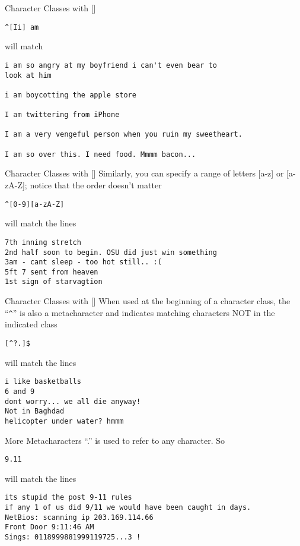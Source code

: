 \documentclass[aspectratio=169]{beamer}
\begin{document}
\begin{frame}[fragile]{Character Classes with []}
\begin{verbatim}
^[Ii] am
\end{verbatim}
will match
\begin{verbatim}
i am so angry at my boyfriend i can't even bear to 
look at him

i am boycotting the apple store

I am twittering from iPhone

I am a very vengeful person when you ruin my sweetheart.

I am so over this. I need food. Mmmm bacon...
\end{verbatim}
\end{frame}

\begin{frame}[fragile]{Character Classes with []}
Similarly, you can specify a range of letters [a-z] or 
[a-zA-Z]; notice that the order doesn't matter
\begin{verbatim}
^[0-9][a-zA-Z]
\end{verbatim}
will match the lines 
\begin{verbatim}
7th inning stretch
2nd half soon to begin. OSU did just win something
3am - cant sleep - too hot still.. :(
5ft 7 sent from heaven 
1st sign of starvagtion
\end{verbatim}
\end{frame}

\begin{frame}[fragile]{Character Classes with []}
When used at the beginning of a character class, the ``\verb+^+'' is also a 
metacharacter and indicates matching characters NOT in the 
indicated class
\begin{verbatim}
[^?.]$
\end{verbatim}
will match the lines 
\begin{verbatim}
i like basketballs 
6 and 9
dont worry... we all die anyway! 
Not in Baghdad
helicopter under water? hmmm
\end{verbatim}
\end{frame}

\begin{frame}[fragile]{More Metacharacters}
``.'' is used to refer to any character. So
\begin{verbatim}
9.11
\end{verbatim}
will match the lines 
\begin{verbatim}
its stupid the post 9-11 rules 
if any 1 of us did 9/11 we would have been caught in days.
NetBios: scanning ip 203.169.114.66
Front Door 9:11:46 AM
Sings: 0118999881999119725...3 !
\end{verbatim}
\end{frame}
\end{document}
